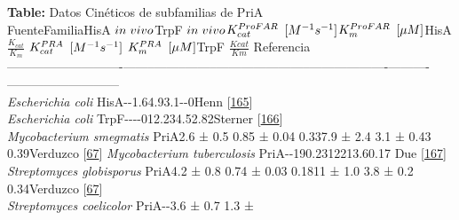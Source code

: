 \documentclass[12pt,twoside]{reedthesis}
\begin{document}
  \textbf{Table:} Datos Cinéticos de subfamilias de PriA
  \label{tab:cineticos}\\
  \textbar{}Fuente\textbar{}Familia\textbar{}HisA
  \(in\hspace{.1cm}vivo\)\textbar{}TrpF
  \(in\hspace{.1cm}vivo\)\textbar{}\(K_{cat}^{\tiny{ProFAR}}\)
  \(\tiny{[M^{-1}s^{-1}]}\)\textbar{}\(K_m^{\tiny{ProFAR}}\)
  \(\tiny{[\mu M]}\)\textbar{}HisA \(\frac{K_{cat}}{K_m}\)
  \textbar{}\(K_{cat}^{\tiny{PRA}}\) \(\tiny{[M^{-1}s^{-1}]}\)
  \textbar{}\(K_m^{\tiny{PRA}}\) \(\tiny{[\mu M]}\)\textbar{}TrpF
  \(\frac{Kcat}{Km}\) \textbar{}Referencia\textbar{}\\
  \textbar{}----------------------------\textbar{}--------\textbar{}--------\textbar{}--------\textbar{}------------\textbar{}-----------\textbar{}---------\textbar{}----------\textbar{}----------\textbar{}------\textbar{}---------------------\textbar{}\\
  \textbar{} \emph{Escherichia coli}
  \textbar{}HisA\textbar{}-\textbar{}-\textbar{}1.6\textbar{}4.9\textbar{}3.1\textbar{}-\textbar{}-\textbar{}0\textbar{}Henn
  {[}\protect\hyperlink{ref-henn-sax_two_2002}{165}{]}\textbar{}\\
  \textbar{} \emph{Escherichia coli}
  \textbar{}TrpF\textbar{}-\textbar{}-\textbar{}-\textbar{}-\textbar{}0\textbar{}12.2\textbar{}34.5\textbar{}2.82\textbar{}Sterner
  {[}\protect\hyperlink{ref-sterner_phosphoribosyl_1996}{166}{]}\textbar{}\\
  \textbar{} \emph{Mycobacterium smegmatis}
  \textbar{}PriA\textbar{}\emph{\textbar{}}\textbar{}2.6 ± 0.5
  \textbar{}0.85 ± 0.04 \textbar{}0.33\textbar{}7.9 ± 2.4\textbar{} 3.1 ±
  0.43 \textbar{}0.39\textbar{}Verduzco
  {[}\protect\hyperlink{ref-verduzco-castro_co-occurrence_2016}{67}{]}\textbar{}
  \textbar{} \emph{Mycobacterium tuberculosis}
  \textbar{}PriA\textbar{}-\textbar{}-\textbar{}19\textbar{}0.23\textbar{}12\textbar{}21\textbar{}3.6\textbar{}0.17\textbar{}
  Due {[}\protect\hyperlink{ref-due_bisubstrate_2011}{167}{]}\textbar{}\\
  \textbar{} \emph{Streptomyces globisporus}
  \textbar{}PriA\textbar{}\emph{\textbar{}}\textbar{}4.2 ± 0.8\textbar{}
  0.74 ± 0.03 \textbar{}0.18\textbar{}11 ± 1.0 \textbar{}3.8 ± 0.2
  \textbar{}0.34\textbar{}Verduzco
  {[}\protect\hyperlink{ref-verduzco-castro_co-occurrence_2016}{67}{]}\textbar{}\\
  \textbar{} \emph{Streptomyces coelicolor}
  \textbar{}PriA\textbar{}-\textbar{}-\textbar{}3.6 ± 0.7 \textbar{}1.3 ±
\end{document}
